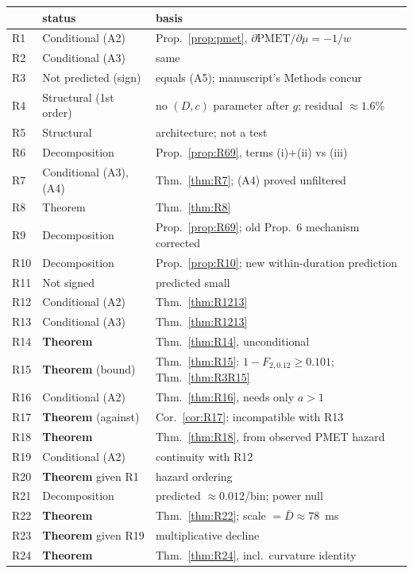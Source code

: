 \documentclass[11pt,a4paper]{article}
\theoremstyle{plain}
\theoremstyle{remark}
\begin{document}
\begin{center}
\begin{tabular}{llp{}}
\toprule
& status & basis\\
\midrule
R1 & Conditional (A2) & Prop.~\ref{prop:pmet}, $\partial\text{PMET}/\partial\mu=-1/w$\\
R2 & Conditional (A3) & same\\
R3 & Not predicted (sign) & equals (A5); manuscript's Methods concur\\
R4 & Structural (1st order) & no $(D,c)$ parameter after $g$; residual $\approx1.6$\%\\
R5 & Structural & architecture; not a test\\
R6 & Decomposition & Prop.~\ref{prop:R69}, terms (i)+(ii) vs (iii)\\
R7 & Conditional (A3),(A4) & Thm.~\ref{thm:R7}; (A4) proved unfiltered\\
R8 & Theorem & Thm.~\ref{thm:R8}\\
R9 & Decomposition & Prop.~\ref{prop:R69}; old Prop.~6 mechanism corrected\\
R10 & Decomposition & Prop.~\ref{prop:R10}; new within-duration prediction\\
R11 & Not signed & predicted small\\
R12 & Conditional (A2) & Thm.~\ref{thm:R1213}\\
R13 & Conditional (A3) & Thm.~\ref{thm:R1213}\\
R14 & \textbf{Theorem} & Thm.~\ref{thm:R14}, unconditional\\
R15 & \textbf{Theorem} (bound) & Thm.~\ref{thm:R15}: $1-F_{2,0.12}\ge0.101$; Thm.~\ref{thm:R3R15}\\
R16 & Conditional (A2) & Thm.~\ref{thm:R16}, needs only $a>1$\\
R17 & \textbf{Theorem} (against) & Cor.~\ref{cor:R17}: incompatible with R13\\
R18 & \textbf{Theorem} & Thm.~\ref{thm:R18}, from observed PMET hazard\\
R19 & Conditional (A2) & continuity with R12\\
R20 & \textbf{Theorem} given R1 & hazard ordering\\
R21 & Decomposition & predicted $\approx0.012$/bin; power null\\
R22 & \textbf{Theorem} & Thm.~\ref{thm:R22}; scale $=\bar D\approx78$~ms\\
R23 & \textbf{Theorem} given R19 & multiplicative decline\\
R24 & \textbf{Theorem} & Thm.~\ref{thm:R24}, incl.\ curvature identity\\
\bottomrule
\end{tabular}
\end{center}
\end{document}

